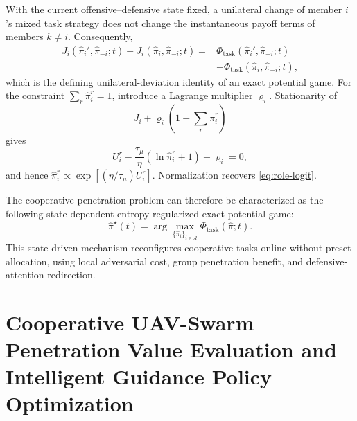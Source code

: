 \documentclass[unbranded]{cja}
\begin{document}
With the current offensive--defensive state fixed, a unilateral change of member $i$'s mixed task strategy does not change the instantaneous payoff terms of members $k\ne i$. Consequently,
\begin{equation}
\begin{aligned}
J_i(\hat{\pi}_i',\hat{\pi}_{-i};t)-J_i(\hat{\pi}_i,\hat{\pi}_{-i};t)
={}&\Phi_{\mathrm{task}}(\hat{\pi}_i',\hat{\pi}_{-i};t)\\
&-\Phi_{\mathrm{task}}(\hat{\pi}_i,\hat{\pi}_{-i};t),
\end{aligned}
\end{equation}
which is the defining unilateral-deviation identity of an exact potential game. For the constraint $\sum_r\hat{\pi}_i^r=1$, introduce a Lagrange multiplier $\varrho_i$. Stationarity of
\begin{equation}
J_i+\varrho_i\left(1-\sum_r\hat{\pi}_i^r\right)
\label{eq:task-game-lagrangian}
\end{equation}
gives
\begin{equation}
U_i^r-\frac{\tau_\mu}{\eta}\left(\ln\hat{\pi}_i^r+1\right)-\varrho_i=0,
\label{eq:task-game-stationarity}
\end{equation}
and hence $\hat{\pi}_i^r\propto\exp[(\eta/\tau_\mu)U_i^r]$. Normalization recovers \eqref{eq:role-logit}.


The cooperative penetration problem can therefore be characterized as the following state-dependent entropy-regularized exact potential game:
\begin{equation}
\hat{\pi}^{\star}(t)
=
\arg\max_{\{\hat{\pi}_i\}_{i\in\mathcal{A}}}
\Phi_{\mathrm{task}}(\hat{\pi};t).
\end{equation}
This state-driven mechanism reconfigures cooperative tasks online without preset allocation, using local adversarial cost, group penetration benefit, and defensive-attention redirection.

\section{Cooperative UAV-Swarm Penetration Value Evaluation and Intelligent Guidance Policy Optimization}
\end{document}

